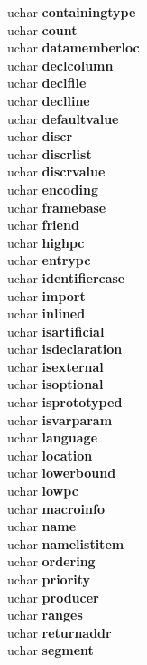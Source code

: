 \begin{DoxyCompactItemize}
\begin{tabbing}
\>uchar {\bfseries containingtype}\\
\>uchar {\bfseries count}\\
\>uchar {\bfseries datamemberloc}\\
\>uchar {\bfseries declcolumn}\\
\>uchar {\bfseries declfile}\\
\>uchar {\bfseries declline}\\
\>uchar {\bfseries defaultvalue}\\
\>uchar {\bfseries discr}\\
\>uchar {\bfseries discrlist}\\
\>uchar {\bfseries discrvalue}\\
\>uchar {\bfseries encoding}\\
\>uchar {\bfseries framebase}\\
\>uchar {\bfseries friend}\\
\>uchar {\bfseries highpc}\\
\>uchar {\bfseries entrypc}\\
\>uchar {\bfseries identifiercase}\\
\>uchar {\bfseries import}\\
\>uchar {\bfseries inlined}\\
\>uchar {\bfseries isartificial}\\
\>uchar {\bfseries isdeclaration}\\
\>uchar {\bfseries isexternal}\\
\>uchar {\bfseries isoptional}\\
\>uchar {\bfseries isprototyped}\\
\>uchar {\bfseries isvarparam}\\
\>uchar {\bfseries language}\\
\>uchar {\bfseries location}\\
\>uchar {\bfseries lowerbound}\\
\>uchar {\bfseries lowpc}\\
\>uchar {\bfseries macroinfo}\\
\>uchar {\bfseries name}\\
\>uchar {\bfseries namelistitem}\\
\>uchar {\bfseries ordering}\\
\>uchar {\bfseries priority}\\
\>uchar {\bfseries producer}\\
\>uchar {\bfseries ranges}\\
\>uchar {\bfseries returnaddr}\\
\>uchar {\bfseries segment}\\

\end{tabbing}
\end{DoxyCompactItemize}
